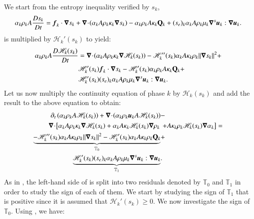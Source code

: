 \documentclass[preprint,10pt]{elsarticle}
\begin{document}
{\begin{appendices}
We start from the entropy inequality verified by $s_k$, 
%
\begin{equation}\label{eq:ent-res-7-eqn-diss-terms-app}
\alpha_k \rho_k A \frac{Ds_k}{Dt} =  \boldsymbol f_k \cdot \boldsymbol\nabla s_k + \boldsymbol\nabla\! \cdot \! \left( \alpha_k A \rho_k \kappa_k  \boldsymbol\nabla s_k \right)  
- \alpha_k \rho_k A \kappa_k \mathbf{Q}_k + (s_e)_k \alpha_k A \rho_k \mu_k \boldsymbol\nabla^s \boldsymbol u_k : \boldsymbol\nabla \boldsymbol u_k.
\end{equation}
%
 is multiplied by $\mathscr{H}_k'(s_k)$ to yield:
%
\begin{align}\label{eq:ent-res-7-eqn-diss-terms-app2}
\alpha_k \rho_k A \frac{D\mathscr{H}_k(s_k)}{Dt} &= \boldsymbol\nabla\! \cdot \! \left( \alpha_k A \rho_k \kappa_k \boldsymbol\nabla \mathscr{H}_k (s_k) \right) - \mathscr{H}_k''(s_k) \alpha_k A \kappa_k \rho_k \| \boldsymbol\nabla s_k \|^2 + \nonumber\\
&\mathscr{H}_k'(s_k) \boldsymbol f_k \cdot \boldsymbol\nabla s_k - \mathscr{H}_k'(s_k)\alpha_k \rho_k A \kappa_k \mathbf{Q}_k + \nonumber \\
& \mathscr{H}_k'(s_k)(s_e)_k \alpha_k A \rho_k \mu_k \boldsymbol\nabla^s \boldsymbol u_k : \boldsymbol\nabla \boldsymbol u_k.
\end{align}
%
Let us now multiply the continuity equation of phase $k$ by $\mathscr{H}_k (s_k)$ and add the result to the above equation to obtain:
%
\begin{align}\label{eq:ent-res-7-eqn-diss-terms-app3}
\partial_t \left( \alpha_k \rho_k A \mathscr{H}_k(s_k)\right) + \boldsymbol\nabla\! \cdot \! \left( \alpha_k \rho_k \boldsymbol u_k A \mathscr{H}_k(s_k) \right)  &- \nonumber\\
\boldsymbol\nabla\! \cdot \! \left[ \alpha_k A \rho_k \kappa_k \boldsymbol\nabla \mathscr{H}_k (s_k) + \alpha_k A \kappa_k \mathscr{H}_k (s_k) \boldsymbol\nabla \rho_k  \right. & \left. + A \kappa_k \rho_k \mathscr{H}_k (s_k) \boldsymbol\nabla \alpha_k\right] = \nonumber \\
 \underbrace{-\mathscr{H}_k''(s_k) \alpha_k A \kappa_k \rho_k \| \boldsymbol\nabla s_k \|^2  - \mathscr{H}_k'(s_k) \alpha_k A \kappa_k \rho_k  \mathbf{Q}_k}_{\mathbb{T}_0} &+\nonumber \\
\underbrace{ \mathscr{H}_k'(s_k)(s_e)_k  \alpha_k A \rho_k \mu_k \boldsymbol\nabla^s \boldsymbol u_k : \boldsymbol\nabla \boldsymbol u_k}_{\mathbb{T}_1} & .
\end{align}
%
As in , the left-hand side of  is split into two residuals denoted by $\mathbb{T}_0$ and $\mathbb{T}_1$ in order to study the sign of each of them. We start by studying the sign of $\mathbb{T}_1$ that is positive since it is assumed that $ \mathscr{H}_k'(s_k) \geq 0$. We now investigate the sign of $\mathbb{T}_0$. Using , we have:

\end{appendices}}
\end{document}
